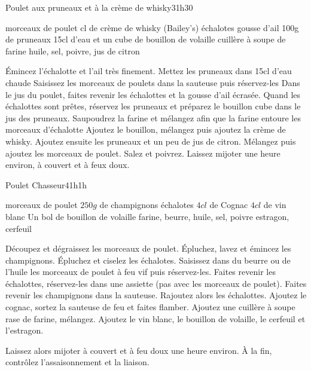\begin{recette}{Poulet aux pruneaux et à la crème de whisky}{3}{1h30}{}
\begin{ingredients}
 morceaux de poulet
 cl de crème de whisky (Bailey's)
 échalotes
 gousse d'ail
\ingredient 100g de pruneaux
\ingredient 15cl d'eau et un cube de bouillon de volaille
 cuillère à soupe de farine
\ingredient huile, sel, poivre, jus de citron
\end{ingredients}

\begin{preparation}
\etape Émincez l'échalotte et l'ail très finement. Mettez les pruneaux dans 15cl d'eau chaude
\etape Saisissez les morceaux de poulets dans la sauteuse puis réservez-les
\etape Dans le jus du poulet, faites revenir les échalottes et la gousse d'ail écrasée.
\etape Quand les échalottes sont prêtes, réservez les pruneaux et préparez le bouillon cube dans le jus des pruneaux. Saupoudrez la farine et mélangez afin que la farine entoure les morceaux d'échalotte
\etape Ajoutez le bouillon, mélangez puis ajoutez la crème de whisky. Ajoutez ensuite les pruneaux et un peu de jus de citron. Mélangez puis ajoutez les morceaux de poulet. Salez et poivrez.
\etape Laissez mijoter une heure environ, à couvert et à feux doux.
\end{preparation}

\end{recette}

\begin{recette}{Poulet Chasseur}{4}{1h}{1h}
\begin{ingredients}
 morceaux de poulet
\ingredient $250\unit{g}$ de champignons
 échalotes
\ingredient $4\unit{cl}$ de Cognac
\ingredient $4\unit{cl}$ de vin blanc
\ingredient Un bol de bouillon de volaille
\ingredient farine, beurre, huile, sel, poivre
\ingredient estragon, cerfeuil
\end{ingredients}


\begin{preparation}
\etape Découpez et dégraissez les morceaux de poulet. Épluchez, lavez et émincez les champignons. Épluchez et ciselez les échalotes.
\etape Saisissez dans du beurre ou de l'huile les morceaux de poulet à feu vif puis réservez-les.
\etape Faites revenir les échalottes, réservez-les dans une assiette (pas avec les morceaux de poulet).
\etape Faites revenir les champignons dans la sauteuse. 
\etape Rajoutez alors les échalottes. Ajoutez le cognac, sortez la sauteuse de feu et faites flamber. 
\etape Ajoutez une cuillère à soupe rase de farine, mélangez.
\etape Ajoutez le vin blanc, le bouillon de volaille, le cerfeuil et l'estragon. 
\end{preparation}

\begin{cuisson}
Laissez alors mijoter à couvert et à feu doux une heure environ. À la fin, contrôlez l'assaisonnement et la liaison.
\end{cuisson}


\end{recette}

